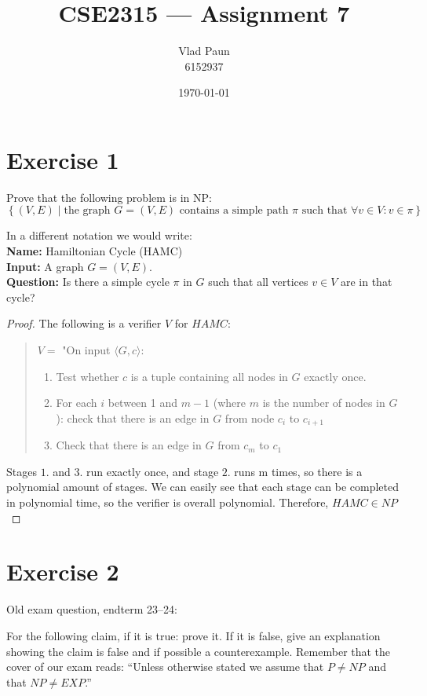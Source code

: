 \documentclass[a4paper,11pt]{article}
\title{\textbf{CSE2315 --- Assignment 7}}
\author{Vlad Paun \\ 6152937}
\date{\today}
\newcommand{\set}[1]{\left\{ #1 \right\}}
\begin{document}
	\maketitle

	\section{Exercise 1}
	Prove that the following problem is in NP:
	\[
	\set{(V,E) \mid \text{the graph } G=(V,E) \text{ contains a simple path } \pi \text{ such that } \forall v \in V : v \in \pi}
	\]

	In a different notation we would write:\\
	\textbf{Name:} Hamiltonian Cycle (HAMC)\\
	\textbf{Input:} A graph $G=(V,E)$.\\
	\textbf{Question:} Is there a simple cycle $\pi$ in $G$ such that all vertices $v \in V$ are in that cycle?

	\begin{proof}
		The following is a verifier $V$ for $HAMC$:
		\begin{quote}
			$V=$ "On input $\langle G,c \rangle$:
			\begin{enumerate}
				\item Test whether $c$ is a tuple containing all nodes in $G$ exactly once.
				\item For each $i$ between 1 and $m-1$ (where $m$ is the number of nodes in $G$): check that there is an edge in $G$ from node $c_i$ to $c_{i+1}$
				\item Check that there is an edge in $G$ from $c_m$ to $c_1$
			\end{enumerate}
		\end{quote}

		Stages $1.$ and $3.$ run exactly once, and stage $2.$ runs m times, so there is a polynomial amount of stages. We can easily see that each stage can be completed in polynomial time, so the verifier is overall polynomial. Therefore, $HAMC\in NP$
	\end{proof}



	\section{Exercise 2}
	Old exam question, endterm 23--24:

	For the following claim, if it is true: prove it. If it is false, give an explanation showing the claim is false and if possible a counterexample. Remember that the cover of our exam reads: ``Unless otherwise stated we assume that $P \neq NP$ and that $NP \neq EXP$.''
\end{document}
